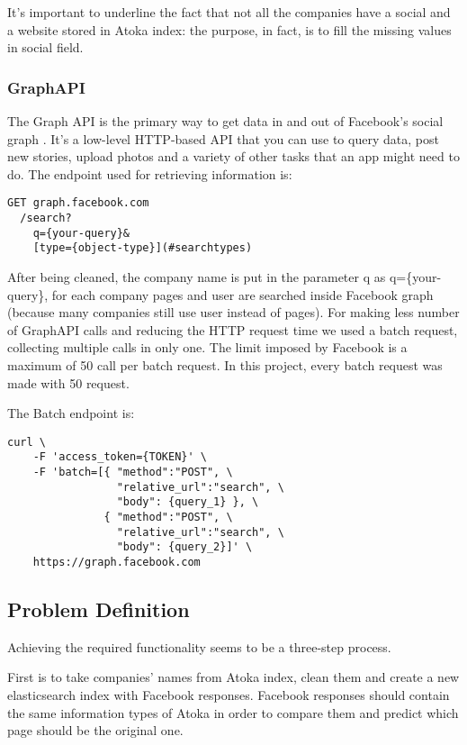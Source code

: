It's important to underline the fact that not all the companies have a social and a website stored in Atoka index: the purpose, in fact, is to fill the missing values in social field.

\subsubsection{GraphAPI} 

The Graph API is the primary way to get data in and out of Facebook's social graph
. It's a low-level HTTP-based API that you can use to query data, post new stories, upload photos and a variety of other tasks that an app might need to do.
The endpoint used for retrieving information is:
\begin{verbatim}
GET graph.facebook.com
  /search?
    q={your-query}&
    [type={object-type}](#searchtypes)
\end{verbatim}

After being cleaned, the company name is put in the parameter q as q=\{your-query\}, for each company pages and user are searched inside Facebook graph (because many companies still use user instead of pages).
For making less number of GraphAPI calls and reducing the HTTP request time we used a batch request, collecting multiple calls in only one. The limit imposed by Facebook is a maximum of 50 call per batch request. In this project, every batch request was made with 50 request.

The Batch endpoint is:
\begin{verbatim}
curl \
    -F 'access_token={TOKEN}' \
    -F 'batch=[{ "method":"POST", \
                 "relative_url":"search", \
                 "body": {query_1} }, \
               { "method":"POST", \
                 "relative_url":"search", \
                 "body": {query_2}]' \
    https://graph.facebook.com
\end{verbatim}

%
%
%
%
%
%

\subsection{Problem Definition}
Achieving the required functionality seems to be a three-step process. 

First is to take companies' names from Atoka index, clean them and create a new elasticsearch index with Facebook responses. Facebook responses should contain the same information types of Atoka in order to compare them and predict which page should be the original one.

